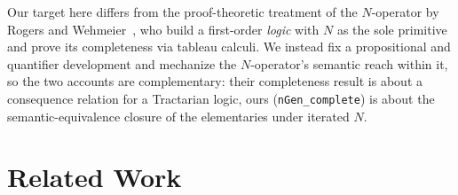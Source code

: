 \documentclass[jsl,bibother]{asl}
\theoremstyle{definition}
\theoremstyle{remark}
\begin{document}
Our target here differs from the proof-theoretic treatment of
the $N$-operator by Rogers and Wehmeier~\cite{rogers2012}, who
build a first-order \emph{logic} with $N$ as the sole primitive
and prove its completeness via tableau calculi.  We instead fix
a propositional and quantifier development and mechanize the
$N$-operator's semantic reach within it, so the two accounts
are complementary: their completeness result is about a
consequence relation for a Tractarian logic, ours
(\texttt{nGen\_complete}) is about the semantic-equivalence
closure of the elementaries under iterated $N$.

\section{Related Work}
\label{sec:related}
\end{document}
